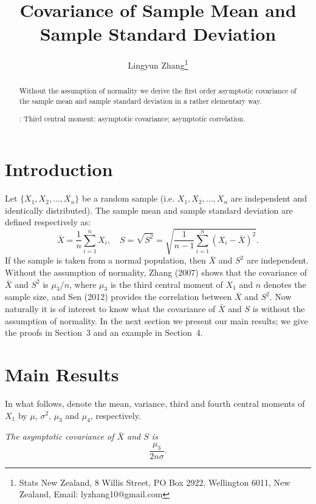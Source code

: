 \documentclass[12pt]{article}
\title{Covariance of Sample Mean and Sample Standard Deviation}
\author{Lingyun Zhang\thanks{Stats New Zealand,
 8 Willis Street,
 PO Box 2922,
 Wellington 6011,
 New Zealand, Email: lyzhang10@gmail.com}}
\def\be{\begin{equation}}
\def\ee{\end{equation}}
\begin{document}
 \maketitle


 \begin{abstract}
Without the assumption of normality we derive the first order
asymptotic covariance of the sample mean and sample standard
deviation in a rather elementary way.

: Third central moment; asymptotic
covariance; asymptotic correlation.

\end{abstract}

 \section{Introduction}

 Let $\{X_1, X_2, \ldots, X_n\}$ be a random sample (i.e. $X_1, X_2, \ldots, X_n$ are independent and
 identically distributed). The sample
 mean and sample standard deviation are defined respectively as:
 $$
 \bar{X}=\frac{1}{n}\sum_{i=1}^n X_i, \quad
 S=\sqrt{S^2}=\sqrt{\frac{1}{n-1}\sum_{i=1}^n(X_i-\bar{X})^2}.
 $$
If the sample is taken from a normal
population, then $\bar{X}$ and $S^2$ are independent.
Without the assumption of normality, Zhang (2007)
shows that the covariance of
$\bar{X}$ and $S^2$ is $\mu_3/n$, where $\mu_3$ is the third
central moment of $X_1$ and $n$ denotes the sample size, and Sen (2012) provides the correlation between $\bar{X}$ and $S^2$.
Now naturally it is of interest to
know what the covariance of $\bar{X}$ and $S$ is without the
assumption of normality. In the next section we present our main
results; we give the proofs in Section~3 and an example in Section~4.


 \section{Main Results}

In what follows, denote the mean, variance, third and fourth
central moments of $X_1$ by $\mu$, $\sigma^2$,  $\mu_3$ and
$\mu_4$, respectively.

 {\it The asymptotic covariance of
$\bar{X}$ and $S$ is}
\be
\frac{\mu_3}{2n\sigma}.
\label{cov}
\ee
\end{document}
